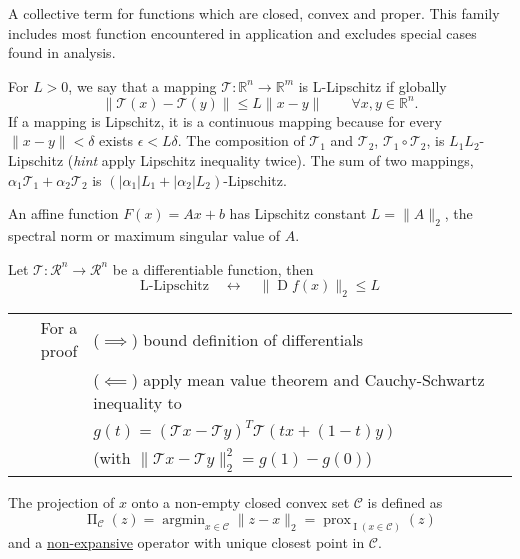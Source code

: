 \documentclass{article}
\DeclareMathOperator{\prox}{prox}
\DeclareMathOperator*{\argmin}{argmin}
\DeclareMathOperator{\jacobian}{D}
\DeclareMathOperator{\proj}{\Pi}
\DeclareMathOperator{\indicator}{I}
\newcommand*\from{\colon}
\begin{document}
\begin{definition}[label=g87jzem_, name=Closed Convex Proper]
		A collective term for functions which are closed, convex and proper. This family includes most function encountered in application and excludes special cases found in analysis.
\end{definition}
\begin{definition}[label=5nalj3hx, name=Lipschitz Regularity]
	For \( L > 0 \), we say that a mapping \( \mathcal T\from\mathbb R^n\to\mathbb R^m \) is L-Lipschitz if globally
	\[
		\lVert \mathcal T(x) - \mathcal T(y) \rVert \leq L\lVert x - y\rVert \qquad \forall x,y\in\mathbb R^n.
	\]
	If a mapping is Lipschitz, it is a continuous mapping because for every
	\( \lVert x - y \rVert < \delta \) exists \( \epsilon < L \delta \). The composition of \( \mathcal T_1 \) and \( \mathcal T_2 \), 
	\( \mathcal T_1 \circ \mathcal T_2 \), is \( L_1L_2 \)-Lipschitz (\textit{hint} apply Lipschitz inequality twice).
	The sum of two mappings, \( \alpha_1\mathcal T_1 + \alpha_2\mathcal T_2 \) is \((|\alpha_1|L_1 + |\alpha_2|L_2)\)-Lipschitz.

	\begin{example}[label=17vzrkyq, name=Affine Function]
		An affine function \(F(x) = Ax + b\) has Lipschitz constant \(L=\lVert A\rVert_2\), 
		the spectral norm or maximum singular value of \(A\).
	\end{example}

	\begin{example}[label=jydhwyqa, name=Differentiable Function]
		Let \( \mathcal T\from\mathcal R^n\to\mathcal R^n\) be a differentiable function, then 
		\[
			\text{L-Lipschitz} \quad \leftrightarrow \quad \lVert\jacobian f(x)\rVert_2 \leq L
		\]

		\begin{tabular}{rl}
			For a proof & (\( \implies \)) bound definition of differentials \\
				    & (\( \impliedby \)) apply mean value
				    theorem and Cauchy-Schwartz inequality to \\
				    &\quad\(g(t) = (\mathcal Tx - \mathcal Ty)^T\mathcal T(tx + (1-t) y) \)\\
				    &\quad(with \(\lVert\mathcal Tx - \mathcal Ty\rVert^2_2 = g(1) - g(0)\))
		\end{tabular}
	\end{example}

	\begin{example}[label=5pxh2ufj, name=Projections]
		The projection of \(x\) onto a non-empty closed convex set \(
		\mathcal C\) is defined as 
		\[
			\proj_{\mathcal C}(z) = \argmin_{x\in\mathcal C}\lVert z
			-x\rVert_2 = \prox_{\indicator(x\in\mathcal C)}(z)
		\]
		and a \hyperref[2s6tfa1j]{non-expansive} operator with unique
		closest point in \( \mathcal C\).


\end{example}
\end{definition}
\end{document}
